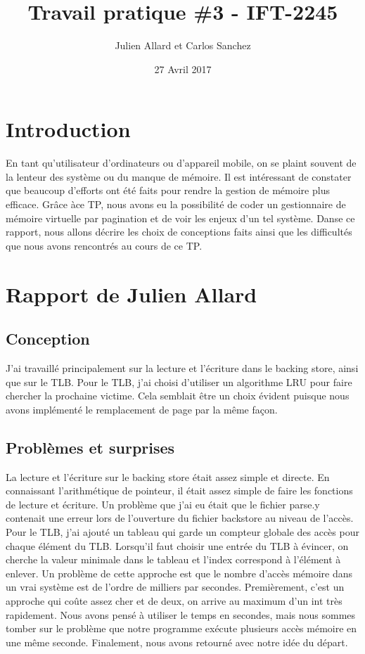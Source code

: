 \documentclass{article}
\title{Travail pratique \#3 - IFT-2245}
\author{Julien Allard et Carlos Sanchez}
\date{27 Avril 2017}
\begin{document}
	
	\maketitle
	\newpage
	\section{Introduction}
	\indent En tant qu'utilisateur d'ordinateurs ou d'appareil mobile, on se plaint souvent de la lenteur des système ou du manque de mémoire. Il est intéressant de constater que beaucoup d'efforts ont été faits pour rendre la gestion de mémoire plus efficace. Grâce àce TP, nous avons eu la possibilité de coder un gestionnaire de mémoire virtuelle par pagination et de voir les enjeux d'un tel système. Danse ce rapport, nous allons décrire les choix de conceptions faits ainsi que les difficultés que nous avons rencontrés au cours de ce TP. 
	
	\section{Rapport de Julien Allard}
	\subsection*{Conception}	
	\indent J'ai travaillé principalement sur la lecture et l'écriture dans le backing store, ainsi que sur le TLB. Pour le TLB, j'ai choisi d'utiliser un algorithme LRU pour faire chercher la prochaine victime. Cela semblait être un choix évident puisque nous avons implémenté le remplacement de page par la même façon.
	
	\subsection*{Problèmes et surprises}
	\indent 
	La lecture et l'écriture sur le backing store était assez simple et directe. En connaissant l'arithmétique de pointeur, il était assez simple de faire les fonctions de lecture et écriture. Un problème que j'ai eu était que le fichier parse.y contenait une erreur lors de l'ouverture du fichier backstore au niveau de l'accès. \\
	
	Pour le TLB, j'ai ajouté un tableau qui garde un compteur globale des accès pour chaque élément du TLB. Lorsqu'il faut choisir une entrée du TLB à évincer, on cherche la valeur minimale dans le tableau et l'index correspond à l'élément à enlever. Un problème de cette approche est que le nombre d'accès mémoire dans un vrai système est de l'ordre de milliers par secondes. Premièrement, c'est un approche qui coûte assez cher et de deux, on arrive au maximum d'un int très rapidement. Nous avons pensé à utiliser le temps en secondes, mais nous sommes tomber sur le problème que notre programme exécute plusieurs accès mémoire en une même seconde. Finalement, nous avons retourné avec notre idée du départ.
	
\end{document}

